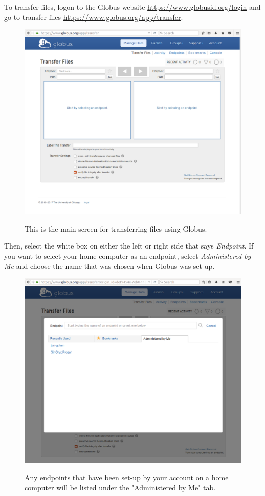 \documentclass[12pt]{article}
\begin{document}
\quad To transfer files, logon to the Globus website \url{https://www.globusid.org/login} and go to transfer files \url{https://www.globus.org/app/transfer}. 

\begin{figure}[H]
\centering
\caption{This is the main screen for transferring files using Globus.}
\includegraphics[width=\textwidth]{globus-transfer}
\label{globus-trsf}
\end{figure}

\quad Then, select the white box on either the left or right side that says \textit{Endpoint}. If you want to select your home computer as an endpoint, select \textit{Administered by Me} and choose the name that was chosen when Globus was set-up.

\begin{figure}[H]
\centering
\caption{Any endpoints that have been set-up by your account on a home computer will be listed under the "Administered by Me" tab.}
\includegraphics[width=\textwidth]{globus-select}
\label{globus-sel}
\end{figure}
\end{document}

